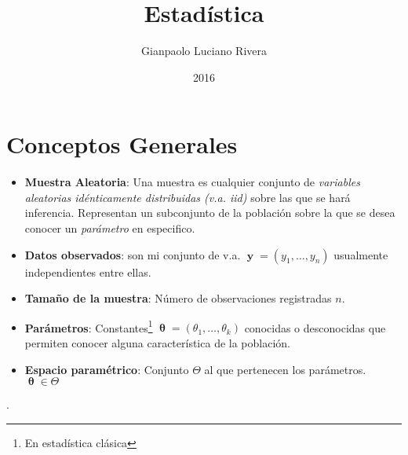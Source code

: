 \documentclass[pdftex,11pt,a4paper]{article}
\title{Estadística}
\author{Gianpaolo Luciano Rivera}
\date{2016}
\DeclareMathOperator{\muestra}{\mathbf{y}}
\DeclareMathOperator{\param}{\mathbf{\theta}}
\begin{document}
\maketitle

\section{Conceptos Generales}
\begin{itemize}
	\item \textbf{Muestra Aleatoria}: Una muestra es cualquier conjunto de \emph{variables aleatorias idénticamente distribuidas (v.a. iid)} sobre las que se hará inferencia. Representan un subconjunto de la población sobre la que se desea conocer un \emph{parámetro} en especifico.
	\item \textbf{Datos observados}: son mi conjunto de v.a. $\muestra = (y_1,\ldots,y_n)$ usualmente independientes entre ellas.
	\item \textbf{Tamaño de la muestra}: Número de observaciones registradas $n$.
	\item \textbf{Parámetros}: Constantes\footnote{En estadística clásica} $\param = (\theta_1,\ldots,\theta_k)$ conocidas o desconocidas que permiten conocer alguna característica de la población. 
	\item \textbf{Espacio paramétrico}: Conjunto $\Theta$ al que pertenecen los parámetros. $\param \in \Theta$
	\end{itemize}.
\end{document}

